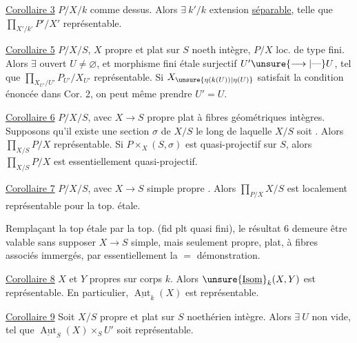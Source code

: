 \uline{Corollaire 3} $P/X/k$ comme dessus. Alors $\exists\ k'/k$ extension  \uline{séparable}, telle que $\prod_{X'/k'}P'/X'$ représentable.


\uline{Corollaire 5} $P/X/S$, $X$ propre et plat sur $S$ noeth intègre, $P/X$ loc. de type fini. Alors $\exists$  ouvert $U\ne\varnothing$, et morphisme fini étale surjectif $U'\unsure{\longrightarrow|\text{—}}U$, tel que $\prod_{X_{U'}/U'}P_{U'}/X_{U'}$ représentable. Si $X_{\unsure{\eta(k(U))|\eta(U)}}$ satisfait la condition énoncée dans Cor. 2, on peut même prendre $U'=U$.

\uline{Corollaire 6} $P/X/S$, avec $X\to S$ propre plat à fibres géométriques intègres. Supposons qu'il existe une section $\sigma$ de $X/S$ le long de laquelle $X/S$ soit   . Alors $\prod_{X/S}P/X$ représentable. Si $P\mathbin{\times}_X(S,\sigma)$ est quasi-projectif sur $S$, alors $\prod_{X/S}P/X$ est essentiellement quasi-projectif.

\uline{Corollaire 7} $P/X/S$, avec $X\to S$ simple propre  . Alors $\prod_{P/X}X/S$ est localement représentable pour la top. étale.

Remplaçant la top étale par la top.  (fid plt quasi fini), le résultat 6 demeure être valable sans supposer $X\to S$ simple, mais seulement propre, plat, à fibres   associés immergés, par essentiellement la $=$ démonstration.

\uline{Corollaire 8} $X$ et $Y$ propres sur corps $k$. Alors $\unsure{\underline{\operatorname{Isom}}}_k(X,Y)$ est représentable. En particulier, $\underline{\operatorname{Aut}}_k(X)$ est représentable.

\uline{Corollaire 9} Soit $X/S$ propre et plat sur $S$ noethérien intègre. Alors $\exists\ U$ non vide,   tel que $\underline{\operatorname{Aut}}_S(X)\times_S U'$ soit représentable.

